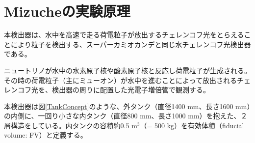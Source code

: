 \documentclass[11pt]{jreport}
\newcommand{\figref}[1]{図\ref{#1}}
\newcommand{\red}[1]{\textcolor{red}{\textbf{#1}}}
\newcommand{\comment}[1]{\red{#1}\footnote{\red{#1}}}
\begin{document}


\section{Mizucheの実験原理}

本検出器は、水中を高速で走る荷電粒子が放出するチェレンコフ光をとらえることにより粒子を検出する、スーパーカミオカンデと同じ水チェレンコフ光検出器である。

ニュートリノが水中の水素原子核や酸素原子核と反応し荷電粒子が生成される。その時の荷電粒子（主にミューオン）が水中を進むことによって放出されるチェレンコフ光を、検出器の周りに配置した光電子増倍管で観測する。


本検出器は\figref{TankConcept}のような、外タンク（直径1400 mm、長さ1600 mm）の内側に、一回り小さな内タンク（直径800 mm、長さ1000 mm）を抱えた、２層構造をしている。内タンクの容積約0.5 m$^{3}$（= 500 kg）を有効体積（fiducial volume: FV）と定義する。
\end{document}
